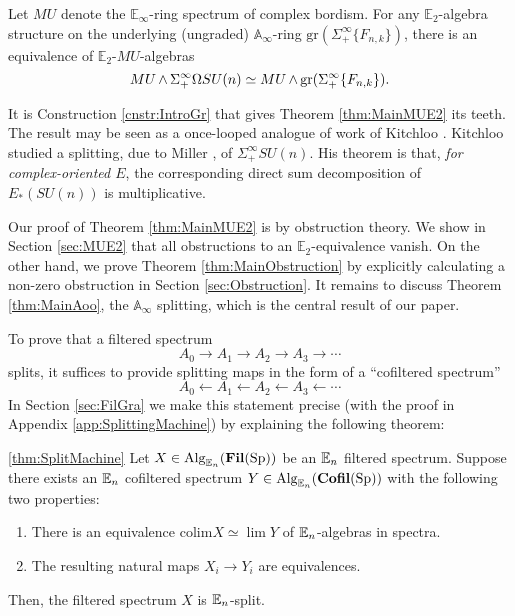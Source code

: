 \begin{thm} \label{thm:MainMUE2}
Let $MU$ denote the $\mathbb{E}_\infty$-ring spectrum of complex bordism.  For any $\mathbb{E}_2$-algebra structure on the underlying (ungraded) $\mathbb{A}_\infty$-ring $\text{gr}(\Sigma^{\infty}_+\{F_{n,k}\})$, there is an equivalence of $\mathbb{E}_2$-$MU$-algebras
$$MU \operatorname{\wedge} \Sigma^{\infty}_+ \Omega SU(n) \simeq MU \operatorname{\wedge} \text{gr}(\Sigma^{\infty}_+\{F_{n,k}\}).$$
\end{thm}

\begin{rmk}
It is Construction \ref{cnstr:IntroGr} that gives Theorem \ref{thm:MainMUE2} its teeth.  The result may be seen as a once-looped analogue of work of Kitchloo \cite{Kitchloo}.   Kitchloo studied a splitting, due to Miller \cite{MillerSplitting}, of $\Sigma^{\infty}_+ SU(n)$.  His theorem is that, \textit{for complex-oriented $E$}, the corresponding direct sum decomposition of $E_*(SU(n))$ is multiplicative.
\end{rmk}

Our proof of Theorem \ref{thm:MainMUE2} is by obstruction theory.  We show in Section \ref{sec:MUE2} that all obstructions to an $\mathbb{E}_2$-equivalence vanish.  On the other hand, we prove Theorem \ref{thm:MainObstruction} by explicitly calculating a non-zero obstruction in Section \ref{sec:Obstruction}.  It remains to discuss Theorem \ref{thm:MainAoo}, the $\mathbb{A}_\infty$ splitting, which is the central result of our paper.

To prove that a filtered spectrum
$$A_0 \longrightarrow A_1 \longrightarrow A_2 \longrightarrow A_3 \longrightarrow \cdots$$
splits, it suffices to provide splitting maps in the form of a ``cofiltered spectrum''
$$A_0 \longleftarrow A_1 \longleftarrow A_2 \longleftarrow A_3 \longleftarrow \cdots$$
In Section \ref{sec:FilGra} we make this statement precise (with the proof in Appendix \ref{app:SplittingMachine}) by explaining the following theorem:

\begin{customthm}{\ref{thm:SplitMachine}}%
Let $X\in \operatorname{\mathrm{Alg}}_{\operatorname{\mathbb{E}}_n}(\operatorname{\mathbf{Fil}}(\operatorname{\mathrm{Sp}}))$ be an $\operatorname{\mathbb{E}}_n$ filtered spectrum.  Suppose there exists an $\operatorname{\mathbb{E}}_n$ cofiltered spectrum $Y\in \operatorname{\mathrm{Alg}}_{\operatorname{\mathbb{E}}_n}(\operatorname{\mathbf{Cofil}}(\operatorname{\mathrm{Sp}}))$ with the following two properties:
\begin{enumerate}
\item There is an equivalence $\mathrm{colim } X \simeq \lim Y$ of $\operatorname{\mathbb{E}}_n$-algebras in spectra.
\item The resulting natural maps $X_i \to Y_i$ are equivalences.  
\end{enumerate}
Then, the filtered spectrum $X$ is $\operatorname{\mathbb{E}}_n$-split.
\end{customthm}

